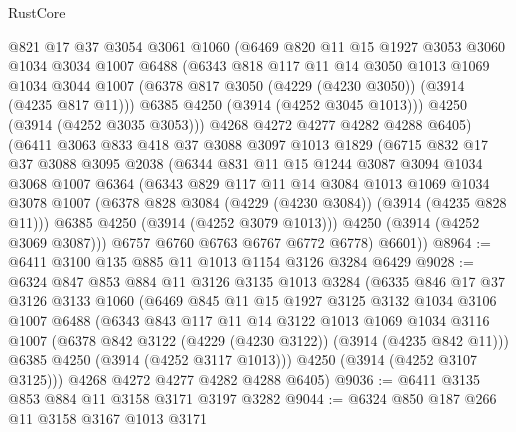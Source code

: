 \begin{lexlean}{RustCore}
\begin{coremodule}
        @821
        @17
        @37
        @3054
        @3061
        @1060
        (@6469
          @820
          @11
          @15
          @1927
          @3053
          @3060
          @1034
          @3034
          @1007
          @6488
          (@6343
            @818
            @117
            @11
            @14
            @3050
            @1013
            @1069
            @1034
            @3044
            @1007
            (@6378 @817 @3050 (@4229 (@4230 @3050)) (@3914 (@4235 @817 @11)))
            @6385
            @4250
            (@3914 (@4252 @3045 @1013)))
          @4250
          (@3914 (@4252 @3035 @3053)))
        @4268
        @4272
        @4277
        @4282
        @4288
        @6405)
      (@6411
        @3063
        @833
        @418
        @37
        @3088
        @3097
        @1013
        @1829
        (@6715
          @832
          @17
          @37
          @3088
          @3095
          @2038
          (@6344
            @831
            @11
            @15
            @1244
            @3087
            @3094
            @1034
            @3068
            @1007
            @6364
            (@6343
              @829
              @117
              @11
              @14
              @3084
              @1013
              @1069
              @1034
              @3078
              @1007
              (@6378 @828 @3084 (@4229 (@4230 @3084)) (@3914 (@4235 @828 @11)))
              @6385
              @4250
              (@3914 (@4252 @3079 @1013)))
            @4250
            (@3914 (@4252 @3069 @3087)))
          @6757
          @6760
          @6763
          @6767
          @6772
          @6778)
        @6601))
@8964 := @6411 @3100 @135 @885 @11 @1013 @1154 @3126 @3284 @6429
@9028 := @6324
    @847
    @853
    @884
    @11
    @3126
    @3135
    @1013
    @3284
    (@6335
      @846
      @17
      @37
      @3126
      @3133
      @1060
      (@6469
        @845
        @11
        @15
        @1927
        @3125
        @3132
        @1034
        @3106
        @1007
        @6488
        (@6343
          @843
          @117
          @11
          @14
          @3122
          @1013
          @1069
          @1034
          @3116
          @1007
          (@6378 @842 @3122 (@4229 (@4230 @3122)) (@3914 (@4235 @842 @11)))
          @6385
          @4250
          (@3914 (@4252 @3117 @1013)))
        @4250
        (@3914 (@4252 @3107 @3125)))
      @4268
      @4272
      @4277
      @4282
      @4288
      @6405)
@9036 := @6411 @3135 @853 @884 @11 @3158 @3171 @3197 @3282
@9044 := @6324 @850 @187 @266 @11 @3158 @3167 @1013 @3171

\end{coremodule}
\end{lexlean}
